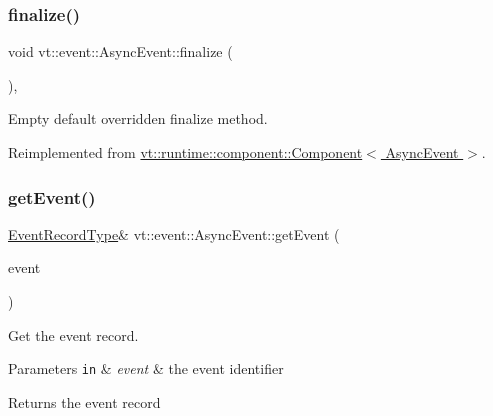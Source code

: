 \subsubsection{\texorpdfstring{finalize()}{finalize()}}
{\footnotesize\ttfamily void vt\+::event\+::\+Async\+Event\+::finalize (\begin{DoxyParamCaption}{ }\end{DoxyParamCaption})\hspace{0.3cm}{\ttfamily [override]}, {\ttfamily [virtual]}}



Empty default overridden finalize method. 



Reimplemented from \hyperlink{structvt_1_1runtime_1_1component_1_1_component_a098e362de01af6054e5491fba671a959}{vt\+::runtime\+::component\+::\+Component$<$ Async\+Event $>$}.

\mbox{\label{structvt_1_1event_1_1_async_event_a78e777586ef948a4436b8dcea3c33be4}} 
\subsubsection{\texorpdfstring{get\+Event()}{getEvent()}}
{\footnotesize\ttfamily \hyperlink{structvt_1_1event_1_1_async_event_a5b4ef37db6e5962fdc0e6e0e56e74bc1}{Event\+Record\+Type}\& vt\+::event\+::\+Async\+Event\+::get\+Event (\begin{DoxyParamCaption}\item[{\hyperlink{namespacevt_a009267401def7ae8bf201892222d060f}{Event\+Type} const \&}]{event }\end{DoxyParamCaption})}



Get the event record. 


\begin{DoxyParams}[1]{Parameters}
\mbox{\tt in}  & {\em event} & the event identifier\\
\hline
\end{DoxyParams}
\begin{DoxyReturn}{Returns}
the event record 
\end{DoxyReturn}
\mbox{\label{structvt_1_1event_1_1_async_event_a27d14dba4b35f66aad75d46fb56227a9}} 
